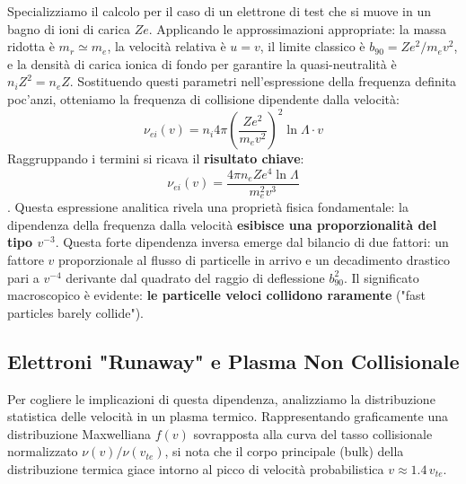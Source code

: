 Specializziamo il calcolo per il caso di un elettrone di test che si muove in un bagno di ioni di carica $Ze$. Applicando le approssimazioni appropriate: la massa ridotta è $m_r \simeq m_e$, la velocità relativa è $u = v$, il limite classico è $b_{90} = Z e^2 / m_e v^2$, e la densità di carica ionica di fondo per garantire la quasi-neutralità è $n_i Z^2 = n_e Z$.
Sostituendo questi parametri nell'espressione della frequenza definita poc'anzi, otteniamo la frequenza di collisione dipendente dalla velocità:
\begin{equation}
\nu_{ei}(v) = n_i 4\pi \left( \frac{Z e^2}{m_e v^2} \right)^2 \ln \Lambda \cdot v
\end{equation}
Raggruppando i termini si ricava il \textbf{risultato chiave}:
\begin{equation}
\nu_{ei}(v) = \frac{4\pi n_e Z e^4 \ln \Lambda}{m_e^2 v^3}
\end{equation}
.
Questa espressione analitica rivela una proprietà fisica fondamentale: la dipendenza della frequenza dalla velocità \textbf{esibisce una proporzionalità del tipo $v^{-3}$}. Questa forte dipendenza inversa emerge dal bilancio di due fattori: un fattore $v$ proporzionale al flusso di particelle in arrivo e un decadimento drastico pari a $v^{-4}$ derivante dal quadrato del raggio di deflessione $b_{90}^2$. Il significato macroscopico è evidente: \textbf{le particelle veloci collidono raramente} ("fast particles barely collide").

\subsection{Elettroni "Runaway" e Plasma Non Collisionale}
Per cogliere le implicazioni di questa dipendenza, analizziamo la distribuzione statistica delle velocità in un plasma termico. Rappresentando graficamente una distribuzione Maxwelliana $f(v)$ sovrapposta alla curva del tasso collisionale normalizzato $\nu(v)/\nu(v_{te})$, si nota che il corpo principale (bulk) della distribuzione termica giace intorno al picco di velocità probabilistica $v \approx 1.4 \, v_{te}$.

